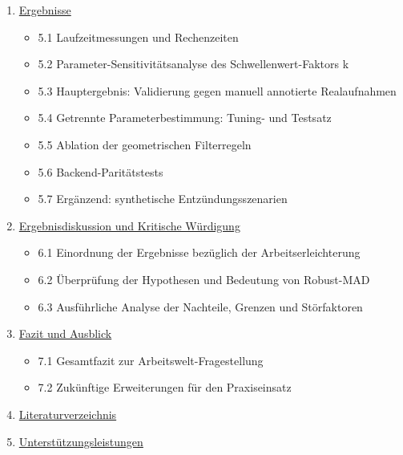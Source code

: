\documentclass[
  11pt,
]{article}
\providecommand{\tightlist}{%
  \setlength{\itemsep}{0pt}\setlength{\parskip}{0pt}}
\begin{document}
\begin{enumerate}
  \begin{itemize}
  \tightlist
  \item
    4.1 Ausgangsmaterial (Original-Thermogramm)
  \item
    4.2 Körpermaskierung und Distanzkarte (Stufe 2)
  \item
    4.3 Hintergrundkorrektur via Top-Hat-Transformation (Stufe 3)
  \item
    4.4 Statistisches Thresholding und Hotspot-Maske (Stufe 4 \& 5)
  \item
    4.5 Finales diagnostisches Overlay für das Behandlungszimmer
  \item
    4.6 Auswertung synthetischer Krankheits-Szenarien (Regressionstest)
  \end{itemize}
\item
  \hyperref[5-ergebnisse]{Ergebnisse}

  \begin{itemize}
  \tightlist
  \item
    5.1 Laufzeitmessungen und Rechenzeiten
  \item
    5.2 Parameter-Sensitivitätsanalyse des Schwellenwert-Faktors k
  \item
    5.3 Hauptergebnis: Validierung gegen manuell annotierte
    Realaufnahmen
  \item
    5.4 Getrennte Parameterbestimmung: Tuning- und Testsatz
  \item
    5.5 Ablation der geometrischen Filterregeln
  \item
    5.6 Backend-Paritätstests
  \item
    5.7 Ergänzend: synthetische Entzündungsszenarien
  \end{itemize}
\item
  \hyperref[6-ergebnisdiskussion-und-kritische-wuxfcrdigung]{Ergebnisdiskussion
  und Kritische Würdigung}

  \begin{itemize}
  \tightlist
  \item
    6.1 Einordnung der Ergebnisse bezüglich der Arbeitserleichterung
  \item
    6.2 Überprüfung der Hypothesen und Bedeutung von Robust-MAD
  \item
    6.3 Ausführliche Analyse der Nachteile, Grenzen und Störfaktoren
  \end{itemize}
\item
  \hyperref[7-fazit-und-ausblick]{Fazit und Ausblick}

  \begin{itemize}
  \tightlist
  \item
    7.1 Gesamtfazit zur Arbeitswelt-Fragestellung
  \item
    7.2 Zukünftige Erweiterungen für den Praxiseinsatz
  \end{itemize}
\item
  \hyperref[8-literaturverzeichnis]{Literaturverzeichnis}
\item
  \hyperref[9-unterstuxfctzungsleistungen]{Unterstützungsleistungen}
\end{enumerate}
\end{document}
